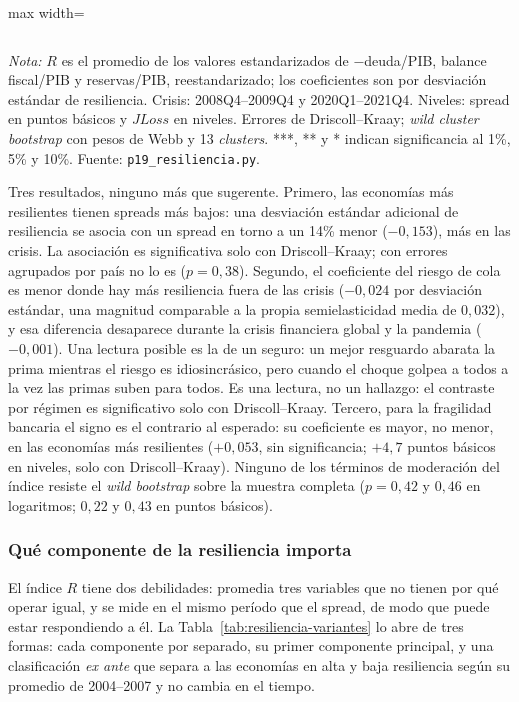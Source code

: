 \begin{table}[htbp]
\begin{adjustbox}{max width=\linewidth}
\begin{tabular}{l cc}
\bottomrule
\end{tabular}
\end{adjustbox}
\par\smallskip\parbox{0.95\linewidth}{\footnotesize \textit{Nota:} $R$ es el promedio de los valores estandarizados de $-$deuda/PIB, balance fiscal/PIB y reservas/PIB, reestandarizado; los coeficientes son por desviación estándar de resiliencia. Crisis: 2008Q4--2009Q4 y 2020Q1--2021Q4. Niveles: spread en puntos básicos y $JLoss$ en niveles. Errores de Driscoll--Kraay; \textit{wild cluster bootstrap} con pesos de Webb y 13 \textit{clusters}. ***, ** y * indican significancia al 1\%, 5\% y 10\%. Fuente: \texttt{p19\_resiliencia.py}.}
\end{table}

Tres resultados, ninguno más que sugerente. Primero, las economías más resilientes tienen spreads más bajos: una desviación estándar adicional de resiliencia se asocia con un spread en torno a un 14\% menor ($-0{,}153$), más en las crisis. La asociación es significativa solo con Driscoll--Kraay; con errores agrupados por país no lo es ($p=0{,}38$). Segundo, el coeficiente del riesgo de cola es menor donde hay más resiliencia fuera de las crisis ($-0{,}024$ por desviación estándar, una magnitud comparable a la propia semielasticidad media de $0{,}032$), y esa diferencia desaparece durante la crisis financiera global y la pandemia ($-0{,}001$). Una lectura posible es la de un seguro: un mejor resguardo abarata la prima mientras el riesgo es idiosincrásico, pero cuando el choque golpea a todos a la vez las primas suben para todos. Es una lectura, no un hallazgo: el contraste por régimen es significativo solo con Driscoll--Kraay. Tercero, para la fragilidad bancaria el signo es el contrario al esperado: su coeficiente es mayor, no menor, en las economías más resilientes ($+0{,}053$, sin significancia; $+4{,}7$ puntos básicos en niveles, solo con Driscoll--Kraay). Ninguno de los términos de moderación del índice resiste el \textit{wild bootstrap} sobre la muestra completa ($p=0{,}42$ y $0{,}46$ en logaritmos; $0{,}22$ y $0{,}43$ en puntos básicos).

\subsubsection{Qué componente de la resiliencia importa}
\label{sec:resiliencia-variantes}

El índice $R$ tiene dos debilidades: promedia tres variables que no tienen por qué operar igual, y se mide en el mismo período que el spread, de modo que puede estar respondiendo a él. La Tabla~\ref{tab:resiliencia-variantes} lo abre de tres formas: cada componente por separado, su primer componente principal, y una clasificación \emph{ex ante} que separa a las economías en alta y baja resiliencia según su promedio de 2004--2007 y no cambia en el tiempo.

